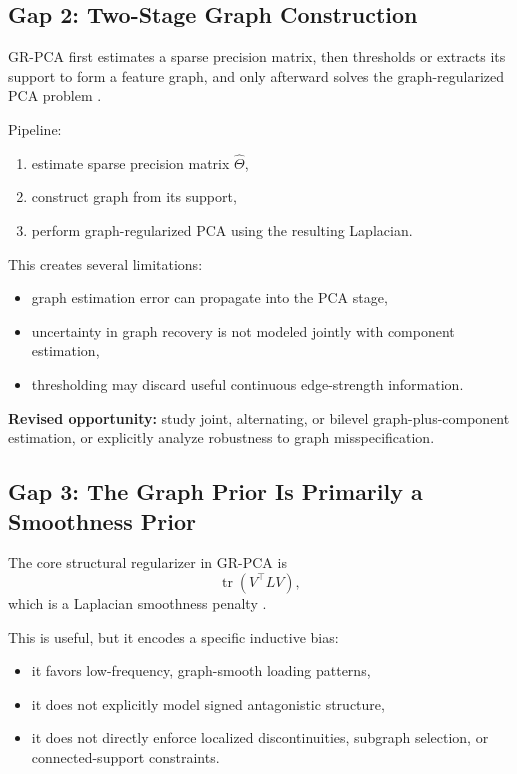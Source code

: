 \documentclass[11pt]{article}
\begin{document}
\subsection{Gap 2: Two-Stage Graph Construction}

GR-PCA first estimates a sparse precision matrix, then thresholds or extracts its support to form a feature graph, and only afterward solves the graph-regularized PCA problem \cite{briola2026grpca}.

Pipeline:
\begin{enumerate}
    \item estimate sparse precision matrix $\widehat{\Theta}$,
    \item construct graph from its support,
    \item perform graph-regularized PCA using the resulting Laplacian.
\end{enumerate}

This creates several limitations:
\begin{itemize}
    \item graph estimation error can propagate into the PCA stage,
    \item uncertainty in graph recovery is not modeled jointly with component estimation,
    \item thresholding may discard useful continuous edge-strength information.
\end{itemize}

\textbf{Revised opportunity:} study joint, alternating, or bilevel graph-plus-component estimation, or explicitly analyze robustness to graph misspecification.

\subsection{Gap 3: The Graph Prior Is Primarily a Smoothness Prior}

The core structural regularizer in GR-PCA is
\[
\operatorname{tr}(V^\top L V),
\]
which is a Laplacian smoothness penalty \cite{briola2026grpca}.

This is useful, but it encodes a specific inductive bias:
\begin{itemize}
    \item it favors low-frequency, graph-smooth loading patterns,
    \item it does not explicitly model signed antagonistic structure,
    \item it does not directly enforce localized discontinuities, subgraph selection, or connected-support constraints.
\end{itemize}
\end{document}

